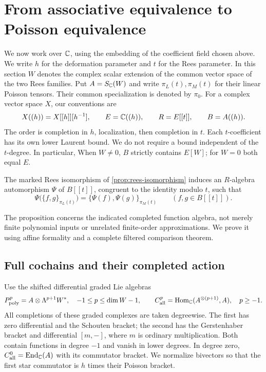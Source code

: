 \section{From associative equivalence to Poisson equivalence}
\label{sec:formality}

We now work over $\mathbb C$, using the embedding of the coefficient field
chosen above. We write $h$ for the deformation parameter and $t$
for the Rees parameter. In this section $W$ denotes the complex scalar
extension of the common vector space of the two Rees families.
Put $A=S_{\mathbb C}(W)$ and write $\pi_L(t),\pi_M(t)$ for their linear
Poisson tensors.  Their common specialization is denoted by $\pi_0$.
For a complex vector space $X$, our conventions are
\[
 X((h))=X[[h]][h^{-1}],\qquad
 E=\mathbb C((h)),\qquad R=E[[t]],\qquad B=A((h)).
\]
The order is completion in $h$, localization, then completion in
$t$.  Each $t$-coefficient has its own lower Laurent bound.  We do not
require a bound independent of the $t$-degree.  In particular,
When $W\ne0$, $B$ strictly contains $E[W]$; for $W=0$ both equal $E$.

\begin{proposition}\label{prop:poisson-comparison}
The marked Rees isomorphism of \cref{prop:rees-isomorphism} induces an
$R$-algebra automorphism $\Psi$ of $B[[t]]$, congruent to the identity
modulo $t$, such that
\[
 \Psi\bigl(\{f,g\}_{\pi_L(t)}\bigr)
   =\{\Psi(f),\Psi(g)\}_{\pi_M(t)}
 \qquad(f,g\in B[[t]]).
\]
\end{proposition}

The proposition concerns the indicated completed function algebra,
not merely finite polynomial inputs or unrelated finite-order
approximations.  We prove it using affine formality and a complete
filtered comparison theorem.

\subsection*{Full cochains and their completed action}

Use the shifted differential graded Lie algebras
\[
 P_{\mathrm{poly}}^p=A\otimes\Lambda^{p+1}W^*,\quad -1\le p\le\dim W-1,
 \qquad
 C_{\mathrm{all}}^p=\operatorname{Hom}_{\mathbb C}(A^{\otimes(p+1)},A),\quad p\ge-1.
\]
All completions of these graded complexes are taken degreewise.
The first has zero differential and the Schouten bracket; the second
has the Gerstenhaber bracket and differential $[m,-]$, where $m$ is
ordinary multiplication.  Both contain functions in degree $-1$ and
vanish in lower degrees.  In degree zero, $C_{\mathrm{all}}^0=\operatorname{End}_{\mathbb C}(A)$
with its commutator bracket.  We normalize bivectors so that the first
star commutator is $h$ times their Poisson bracket.

